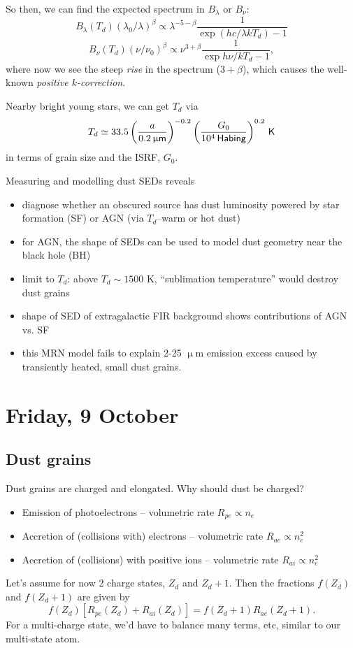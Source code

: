 \documentclass{tufte-handout}
\renewcommand{\rm}{\sf}
\renewcommand{\textrm}{\textsf}
\newcommand{\m}{\upmu} %
\newcommand{\um}{$\m{}$m}
\begin{document}
So then, we can find the expected spectrum in $B_\lambda$ or $B_\nu$:
\[B_{\lambda}(T_d) (\lambda_0/\lambda)^\beta \propto \lambda^{-5 - \beta}\frac{1}{\exp(hc/\lambda kT_d)-1}\]
\[B_\nu(T_d) (\nu/\nu_0)^\beta \propto \nu^{3+\beta}\frac{1}{\exp{h\nu/kT_d}-1},\]
where now we see the steep \textit{rise} in the spectrum ($3+\beta$), which causes the well-known \textit{positive $k$-correction}.


Nearby bright young stars, we can get $T_d$ via 
\[T_d \simeq 33.5 \left (\frac{a}{0.2 \, \textrm{\um}}\right )^{-0.2} \left (\frac{G_0}{10^4 {\rm \, Habing}}\right )^{0.2} {\rm\, K}\]
in terms of grain size and the ISRF, $G_0$.

Measuring and modelling dust SEDs reveals
\begin{itemize}
\item diagnose whether an obscured source has dust luminosity powered by star formation (SF) or AGN (via $T_d$--warm or hot dust)
\item for AGN, the shape of SEDs can be used to model dust geometry near the black hole (BH)
\item limit to $T_d$: above $T_d \sim 1500$ K, ``sublimation temperature'' would destroy dust grains
\item shape of SED of extragalactic FIR background shows contributions of AGN vs. SF
\item this MRN model fails to explain 2-25 \um{} emission excess caused by transiently heated, small dust grains.
\end{itemize}


\section{Friday, 9 October}

\subsection{Dust grains} %
Dust grains are charged and elongated. Why should dust be charged?
\begin{itemize}
\item Emission of photoelectrons -- volumetric rate $R_{pe} \propto n_e$
\item Accretion of (collisions with) electrons -- volumetric rate $R_{ae} \propto n_e^2$
\item Accretion of (collisions) with positive ions -- volumetric rate $R_{ai} \propto n_e^2$
\end{itemize}
Let's assume for now 2 charge states, $Z_d$ and $Z_d + 1$. Then the fractions $f(Z_d)$ and $f(Z_d + 1)$ are given by
\begin{equation}
f(Z_d) \left [R_{pe}(Z_d) + R_{ai}(Z_d)\right ] = f(Z_d + 1) R_{ae}(Z_d + 1).
\end{equation}
For a multi-charge state, we'd have to balance many terms, etc, similar to our multi-state atom.
\end{document}
